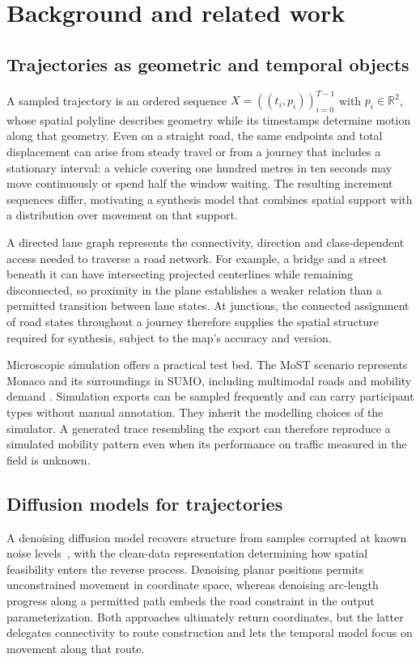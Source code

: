 \chapter{Background and related work}
\label{ch:background}
\section{Trajectories as geometric and temporal objects}
A sampled trajectory is an ordered sequence $X=((t_i,p_i))_{i=0}^{T-1}$ with $p_i\in\mathbb{R}^2$, whose spatial polyline describes geometry while its timestamps determine motion along that geometry. Even on a straight road, the same endpoints and total displacement can arise from steady travel or from a journey that includes a stationary interval: a vehicle covering one hundred metres in ten seconds may move continuously or spend half the window waiting. The resulting increment sequences differ, motivating a synthesis model that combines spatial support with a distribution over movement on that support.

A directed lane graph represents the connectivity, direction and class-dependent access needed to traverse a road network. For example, a bridge and a street beneath it can have intersecting projected centerlines while remaining disconnected, so proximity in the plane establishes a weaker relation than a permitted transition between lane states. At junctions, the connected assignment of road states throughout a journey therefore supplies the spatial structure required for synthesis, subject to the map's accuracy and version.

Microscopic simulation offers a practical test bed. The MoST scenario represents Monaco and its surroundings in SUMO, including multimodal roads and mobility demand \cite{most}. Simulation exports can be sampled frequently and can carry participant types without manual annotation. They inherit the modelling choices of the simulator. A generated trace resembling the export can therefore reproduce a simulated mobility pattern even when its performance on traffic measured in the field is unknown.

\section{Diffusion models for trajectories}
A denoising diffusion model recovers structure from samples corrupted at known noise levels~\cite{ddpm}, with the clean-data representation determining how spatial feasibility enters the reverse process. Denoising planar positions permits unconstrained movement in coordinate space, whereas denoising arc-length progress along a permitted path embeds the road constraint in the output parameterization. Both approaches ultimately return coordinates, but the latter delegates connectivity to route construction and lets the temporal model focus on movement along that route.

